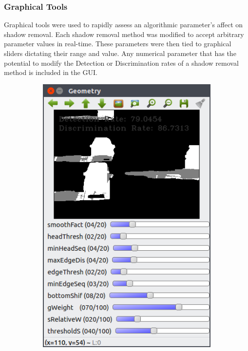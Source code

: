 \documentclass[12pt]{report}
\begin{document}
\subsubsection{Graphical Tools}
Graphical tools were used to rapidly assess an algorithmic parameter's affect on shadow removal. Each shadow removal method was modified to accept arbitrary parameter values in real-time. These parameters were then tied to graphical sliders dictating their range and value. Any numerical parameter that has the potential to modify the Detection or Discrimination rates of a shadow removal method is included in the GUI. 

\begin{figure}
\centering
\begin{subfigure}{.49\linewidth}
  \centering
  \includegraphics[width=.7\linewidth]{figures/geo_highway1_default.png}
  \label{fig:sub1}
\end{subfigure}
\hfill
\begin{subfigure}{.49\linewidth}
  \centering

\end{subfigure}
\end{figure}
\end{document}
